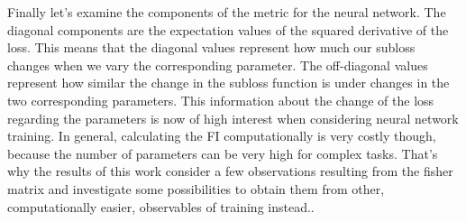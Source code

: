 Finally let's examine the components of the metric for the neural network. The diagonal components are the expectation values of the squared derivative of the loss. This means that the diagonal values represent how much our subloss changes when we vary the corresponding parameter. The off-diagonal values represent how similar the change in the subloss function is under changes in the two corresponding parameters. This information about the change of the loss regarding the parameters is now of high interest when considering neural network training. In general, calculating the FI computationally is very costly though, because the number of parameters can be very high for complex tasks. That's why the results of this work consider a few observations resulting from the fisher matrix and investigate some possibilities to obtain them from other, computationally easier, observables of training instead..